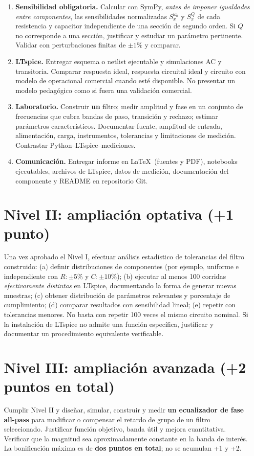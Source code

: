 \documentclass[11pt,a4paper]{article}
\begin{document}
\begin{enumerate}
\item \textbf{Sensibilidad obligatoria.} Calcular con SymPy, \emph{antes de imponer igualdades entre componentes}, las sensibilidades normalizadas $S_x^{\omega_0}$ y $S_x^Q$ de cada resistencia y capacitor independiente de una sección de segundo orden. Si $Q$ no corresponde a una sección, justificar y estudiar un parámetro pertinente. Validar con perturbaciones finitas de $\pm1\%$ y comparar.
\item \textbf{LTspice.} Entregar esquema o netlist ejecutable y simulaciones AC y transitoria. Comparar respuesta ideal, respuesta circuital ideal y circuito con modelo de operacional comercial cuando esté disponible. No presentar un modelo pedagógico como si fuera una validación comercial.
\item \textbf{Laboratorio.} Construir \textbf{un} filtro; medir amplitud y fase en un conjunto de frecuencias que cubra bandas de paso, transición y rechazo; estimar parámetros característicos. Documentar fuente, amplitud de entrada, alimentación, carga, instrumentos, tolerancias y limitaciones de medición. Contrastar Python--LTspice--mediciones.
\item \textbf{Comunicación.} Entregar informe en \LaTeX\ (fuentes y PDF), notebooks ejecutables, archivos de LTspice, datos de medición, documentación del componente y README en repositorio Git.
\end{enumerate}
\section{Nivel II: ampliación optativa (+1 punto)}
Una vez aprobado el Nivel I, efectuar análisis estadístico de tolerancias del filtro construido: (a) definir distribuciones de componentes (por ejemplo, uniforme e independiente con $R:\pm5\%$ y $C:\pm10\%$); (b) ejecutar al menos 100 corridas \emph{efectivamente distintas} en LTspice, documentando la forma de generar nuevas muestras; (c) obtener distribución de parámetros relevantes y porcentaje de cumplimiento; (d) comparar resultados con sensibilidad lineal; (e) repetir con tolerancias menores. No basta con repetir 100 veces el mismo circuito nominal. Si la instalación de LTspice no admite una función específica, justificar y documentar un procedimiento equivalente verificable.
\section{Nivel III: ampliación avanzada (+2 puntos en total)}
Cumplir Nivel II y diseñar, simular, construir y medir \textbf{un ecualizador de fase all-pass} para modificar o compensar el retardo de grupo de un filtro seleccionado. Justificar función objetivo, banda útil y mejora cuantitativa. Verificar que la magnitud sea aproximadamente constante en la banda de interés. La bonificación máxima es de \textbf{dos puntos en total}; no se acumulan +1 y +2.
\end{document}
